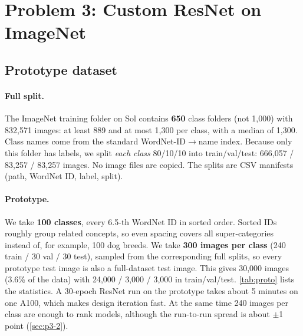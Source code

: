 \documentclass[10pt,twocolumn,letterpaper]{article}
\begin{document}
\section{Problem 3: Custom ResNet on ImageNet}
\label{sec:p3}

\subsection{Prototype dataset}
\label{sec:p3-1}
\paragraph{Full split.}
The ImageNet training folder on Sol contains \textbf{650} class folders (not 1{,}000) with 832{,}571 images: at least 889 and at most 1{,}300 per class, with a median of 1{,}300. Class names come from the standard WordNet-ID$\rightarrow$name index. Because only this folder has labels, we split \emph{each class} 80/10/10 into train/val/test: 666{,}057 / 83{,}257 / 83{,}257 images. No image files are copied. The splits are CSV manifests (path, WordNet ID, label, split).

\paragraph{Prototype.}
We take \textbf{100 classes}, every 6.5-th WordNet ID in sorted order. Sorted IDs roughly group related concepts, so even spacing covers all super-categories instead of, for example, 100 dog breeds. We take \textbf{300 images per class} (240 train / 30 val / 30 test), sampled from the corresponding full splits, so every prototype test image is also a full-dataset test image. This gives 30{,}000 images (3.6\% of the data) with 24{,}000 / 3{,}000 / 3{,}000 in train/val/test. \cref{tab:proto} lists the statistics. A 30-epoch ResNet run on the prototype takes about 5 minutes on one A100, which makes design iteration fast. At the same time 240 images per class are enough to rank models, although the run-to-run spread is about $\pm$1 point (\cref{sec:p3-2}).
\end{document}
